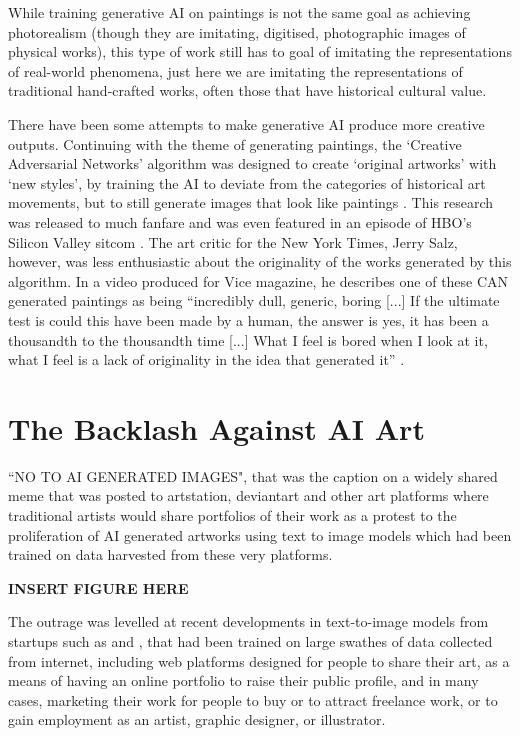 While training generative AI on paintings is not the same goal as achieving photorealism (though they are imitating, digitised, photographic images of physical works), this type of work still has to goal of imitating the representations of real-world phenomena, just here we are imitating the representations of traditional hand-crafted works, often those that have historical cultural value.

There have been some attempts to make generative AI produce more creative outputs. 
Continuing with the theme of generating paintings, the ‘Creative Adversarial Networks’ algorithm was designed to create ‘original artworks’ with ‘new styles’, by training the AI to deviate from the categories of historical art movements, but to still generate images that look like paintings \cite{elgammal2017can}. 
This research was released to much fanfare and was even featured in an episode of HBO’s Silicon Valley sitcom \citep{elhoseiny2019hbo}. 
The art critic for the New York Times, Jerry Salz, however, was less enthusiastic about the originality of the works generated by this algorithm. 
In a video produced for Vice magazine, he describes one of these CAN generated paintings as being “incredibly dull, generic, boring [...] If the ultimate test is could this have been made by a human, the answer is yes, it has been a thousandth to the thousandth time [...] What I feel is bored when I look at it, what I feel is a lack of originality in the idea that generated it” \citep{saltz2018aiart}. 

\section{The Backlash Against AI Art}

``NO TO AI GENERATED IMAGES", that was the caption on a widely shared meme that was posted to artstation, deviantart and other art platforms where traditional artists would share portfolios of their work as a protest to the proliferation of AI generated artworks using text to image models which had been trained on data harvested from these very platforms. 

\textbf{INSERT FIGURE HERE}

The outrage was levelled at recent developments in text-to-image models from startups such as \cite{midjourney2023midjourney} and \cite{stability2023stability} , that had been trained on large swathes of data collected from internet, including web platforms designed for people to share their art, as a means of having an online portfolio to raise their public profile, and in many cases, marketing their work for people to buy or to attract freelance work, or to gain employment as an artist, graphic designer, or illustrator.

